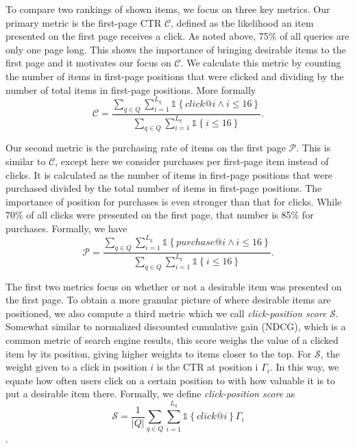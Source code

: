\documentclass{article}
\begin{document}
To compare two rankings of shown items, we focus on three key metrics. Our primary 
metric is the first-page CTR $\mathscr{C}$, defined as the likelihood an item 
presented on the first page receives a click. As noted above, 75\% of all queries 
are only one page long. This shows the importance of bringing desirable items to the 
first page and it motivates our focus on $\mathscr{C}$. We calculate this metric by 
counting the number of items in first-page positions that were clicked and dividing 
by the number of total items in first-page positions. More formally
\begin{equation*}
    \mathscr{C} = \frac{\sum_{q \in Q}\sum_{i=1}^{L_q}\mathds{1}\left\{click @ i \wedge i \leq 16\right\}}{\sum_{q \in Q}\sum_{i=1}^{L_q}\mathds{1}\left\{i \leq 16\right\}}.
\end{equation*}

Our second metric is the purchasing rate of items on the first page $\mathscr{P}$. This is 
similar to $\mathscr{C}$, except here we consider purchases per first-page item 
instead of clicks. It is calculated as the number of items in first-page positions that 
were purchased divided by the total number of items in first-page positions. The 
importance of position for purchases is even stronger than that for clicks. While 70\% of 
all clicks were presented on the first page, that number is 85\% for purchases. Formally,
we have
\begin{equation*}
    \mathscr{P} = \frac{\sum_{q \in Q}\sum_{i=1}^{L_q}\mathds{1}\left\{purchase @ i \wedge i \leq 16\right\}}{\sum_{q \in Q}\sum_{i=1}^{L_q}\mathds{1}\left\{i \leq 16\right\}}.
\end{equation*}

The first two metrics focus on whether or not a desirable item was presented on the 
first page. To obtain a more granular picture of where desirable items are positioned, 
we also compute a third metric which we call {\em click-position score} $\mathscr{S}$. 
Somewhat similar to normalized discounted cumulative gain (NDCG), which is a common metric
of search engine results, this score weighs the value of a clicked item by its position, 
giving higher weights to items closer to the top. For $\mathscr{S}$, the weight given to 
a click in position $i$ is the CTR at position i $\Gamma_i$. In this way, we equate how 
often users click on a certain position to with how valuable it is to put a desirable 
item there. Formally, we define {\em click-position score} as
\begin{equation*}
    \mathscr{S} = \frac{1}{\left\vert{Q}\right\vert}\sum_{q \in Q}\sum_{i=1}^{L_q}\mathds{1}\left\{click @ i\right\}\Gamma_i
\end{equation*}.
\end{document}
